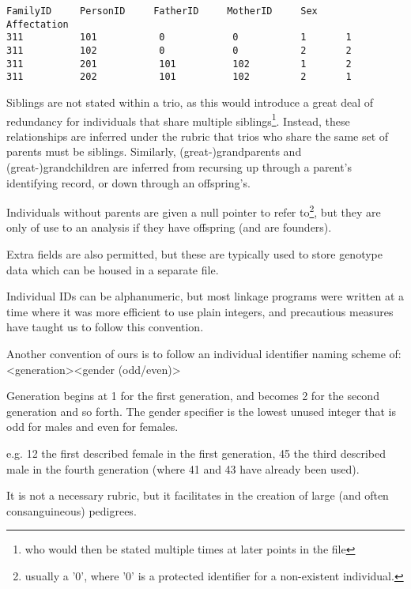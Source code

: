 \begingroup
\begin{lstlisting}[label=verb:pedfile]
FamilyID     PersonID     FatherID     MotherID     Sex     Affectation
311          101           0            0           1       1
311          102           0            0           2       2
311          201           101          102         1       2
311          202           101          102         2       1
\end{lstlisting}
\endgroup

Siblings are not stated within a trio, as this would introduce a great deal of redundancy for individuals that share multiple siblings\footnote{who would then be stated multiple times at later points in the file}. Instead, these relationships are inferred under the rubric that trios who share the same set of parents must be siblings. Similarly, (great-)grandparents and (great-)grandchildren are inferred from recursing up through a parent's identifying record, or down through an offspring's.

Individuals without parents are given a null pointer to refer to\footnote{usually a '0', where '0' is a protected identifier for a non-existent individual.}, but they are only of use to an analysis if they have offspring (and are founders).


Extra fields are also permitted, but these are typically used to store genotype data which can be housed in a separate file.

Individual IDs can be alphanumeric, but most linkage programs were written at a time where it was more efficient to use plain integers, and precautious measures have taught us to follow this convention. 

Another convention of ours is to follow an individual identifier naming scheme of: <generation><gender (odd/even)>

Generation begins at 1 for the first generation, and becomes 2 for the second generation and so forth. The gender specifier is the lowest unused integer that is odd for males and even for females.

e.g.  12 the first described female in the first generation, 45 the third described male in the fourth generation (where 41 and 43 have already been used).

It is not a necessary rubric, but it facilitates in the creation of large (and often consanguineous) pedigrees.

